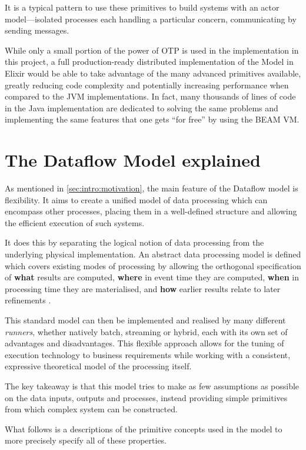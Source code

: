 It is a typical pattern to use these primitives to build systems with an actor model---isolated processes each handling a particular concern, communicating by sending messages.

While only a small portion of the power of OTP is used in the implementation in this project, a full production-ready distributed implementation of the Model in Elixir would be able to take advantage of the many advanced primitives available, greatly reducing code complexity and potentially increasing performance when compared to the JVM implementations.
In fact, many thousands of lines of code in the Java implementation are dedicated to solving the same problems and implementing the same features that one gets ``for free'' by using the BEAM VM.

\section{The Dataflow Model explained}\label{sec:prep:dataflow}

As mentioned in \cref{sec:intro:motivation}, the main feature of the Dataflow model is flexibility.
It aims to create a unified model of data processing which can encompass other processes, placing them in a well-defined structure and allowing the efficient execution of such systems.

It does this by separating the logical notion of data processing from the underlying physical implementation.
An abstract data processing model is defined which covers existing modes of processing by allowing the orthogonal specification of \textbf{what} results are computed, \textbf{where} in event time they are computed, \textbf{when} in processing time they are materialised, and \textbf{how} earlier results relate to later refinements \cite[p.~1793]{Akidau:2015}.

This standard model can then be implemented and realised by many different \emph{runners}, whether natively batch, streaming or hybrid, each with its own set of advantages and disadvantages. 
This flexible approach allows for the tuning of execution technology to business requirements while working with a consistent, expressive theoretical model of the processing itself.

The key takeaway is that this model tries to make as few assumptions as possible on the data inputs, outputs and processes, instead providing simple primitives from which complex system can be constructed.

What follows is a descriptions of the primitive concepts used in the model to more precisely specify all of these properties.

